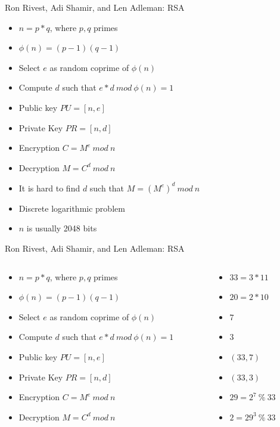 \documentclass{beamer}
\begin{document}
\begin{frame}{Ron Rivest, Adi Shamir, and Len Adleman: RSA}
  \begin{itemize}
    \item $n=p*q$, where $p,q$ primes 
    \item $\phi(n) = (p-1)(q-1)$
    \item Select $e$ as random coprime of $\phi(n)$
    \item Compute $d$ such that $e*d\ mod\ \phi(n) = 1$
    \item Public key $PU = [n,e]$ 
    \item Private Key $PR = [n,d]$
    \item Encryption $C = M^e\ mod\ n$
    \item Decryption $M = C^d\ mod\ n$
    \item<2-> It is hard to find $d$ such that
      $M=(M^e)^d \ mod\ n$
    \item<3-> Discrete logarithmic problem
    \item<4-> $n$ is usually 2048 bits 
  \end{itemize}
\end{frame}

\begin{frame}{Ron Rivest, Adi Shamir, and Len Adleman: RSA}
\begin{columns}
\begin{column}{0.70\textwidth}
  \begin{itemize}
    \item $n=p*q$, where $p,q$ primes 
    \item $\phi(n) = (p-1)(q-1)$
    \item Select $e$ as random coprime of $\phi(n)$
    \item Compute $d$ such that $e*d\ mod\ \phi(n) = 1$
    \item Public key $PU = [n,e]$ 
    \item Private Key $PR = [n,d]$
    \item Encryption $C = M^e\ mod\ n$
    \item Decryption $M = C^d\ mod\ n$
  \end{itemize}
\end{column}
\begin{column}{0.3\textwidth}  %
  \begin{itemize}
    \item<2-> $33=3*11$ 
    \item<3-> $20=2*10$
    \item<4-> $7$
    \item<5-> $3$
    \item<6-> $(33,7)$
    \item<7-> $(33,3)$
    \item<8-> $29=2^7\ \%\ 33$
    \item<9-> $2=29^3\ \%\ 33$
  \end{itemize}
\end{column}
\end{columns}
\end{frame}
\end{document}

